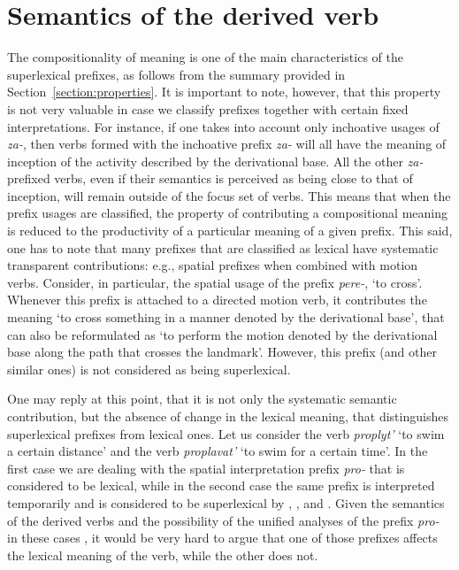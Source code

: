\section{Semantics of the derived verb}\label{section:new:compositionality}
The compositionality of meaning is one of the main characteristics of the superlexical prefixes, as follows from the summary provided in Section~\ref{section:properties}. It is important to note, however, that this property is not very valuable in case we classify prefixes together with certain fixed interpretations. For instance, if one takes into account only inchoative usages of \textit{za-}, then verbs formed with the inchoative prefix \textit{za-} will all have the meaning of inception of the activity described by the derivational base. All the other \textit{za-}prefixed verbs, even if their semantics is perceived as being close to that of inception, will remain outside of the focus set of verbs. This means that when the prefix usages are classified, the property of contributing a compositional meaning is reduced to the productivity of a particular meaning of a given prefix. This said, one has to note that many prefixes that are classified as lexical have systematic transparent contributions: e.g., spatial prefixes when combined with motion verbs. Consider, in particular, the spatial usage of the prefix \textit{pere-}, `to cross'. Whenever this prefix is attached to a directed motion verb, it contributes the meaning `to cross something in a manner denoted by the derivational base', that can also be reformulated as `to perform the motion denoted by the derivational base along the path that crosses the landmark'. However, this prefix (and other similar ones) is not considered as being superlexical.

One may reply at this point, that it is not only the systematic semantic contribution, but the absence of change in the lexical meaning, that distinguishes superlexical prefixes from lexical ones. Let us consider the verb \textit{proplyt'}\textsuperscript{\PF} `to swim a certain distance' and the verb \textit{proplavat'}\textsuperscript{\PF} `to swim for a certain time'. In the first case we are dealing with the spatial interpretation prefix \textit{pro-} that is considered to be lexical, while in the second case the same prefix is interpreted temporarily and is considered to be superlexical by \citet{Babko-Malaya:99}, \citet{Svenonius:04a}, and \citet{Svenonius:12}. Given the semantics of the derived verbs and the possibility of the unified analyses of the prefix \textit{pro-} in these cases \citep{Kagan:book, ZinovaOsswald:paper}, it would be very hard to argue that one of those prefixes affects the lexical meaning of the verb, while the other does not. 

